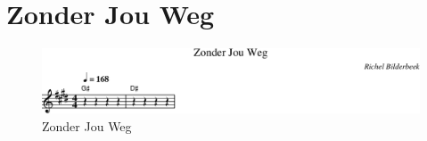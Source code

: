 \chapter{Zonder Jou Weg}



\begin{figure}[!htbp]
  \includegraphics[width=\textwidth,height=\textheight,keepaspectratio]{../songs/27_zonder_jou_weg.png}
  \caption{Zonder Jou Weg}
  \label{fig:27_zonder_jou_weg}
\end{figure}
